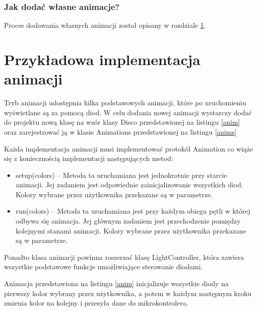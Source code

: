 \documentclass[12pt]{report}
\begin{document}
\subsubsection{Jak dodać własne animacje?}

Proces dodawania własnych animacji został opisany w rozdziale  \ref{animacje}.

\section{Przykładowa implementacja animacji} \label{animacje}

Tryb animacji udostępnia kilka podstawowych animacji, które po uruchomieniu wyświetlane są za pomocą diod. W celu dodania nowej animacji wystarczy dodać do projektu nową klasę na wzór klasy Disco przedstawionej na listingu \ref{anim} oraz zarejestrować ją w klasie Animations przedstawionej na listingu \ref{anims}

 \label{anim}

Każda implementacja animacji musi implementować protokół Animation co wiąże się z koniecznością implementacji następujących metod:

\begin{itemize}
	\item setup(colors) -- Metoda ta uruchamiana jest jednokrotnie przy starcie animacji. Jej zadaniem jest odpowiednie zainicjalizowanie wszystkich diod. Kolory wybrane przez użytkownika przekazane są w parametrze.
	\item run(colors) -- Metoda ta uruchamiana jest przy każdym obiegu pętli w której odbywa się animacja. Jej głównym zadaniem jest przechodzenie pomiędzy kolejnymi stanami animacji. Kolory wybrane przez użytkownika przekazane są w parametrze.
\end{itemize}

Ponadto klasa animacji powinna roszerzać klasę LightController, która zawiera wszystkie podstawowe funkcje umożliwiające sterowanie diodami.

Animacja przedstawiona na listingu \ref{anim} inicjalizuje wszystkie diody na pierwszy kolor wybrany przez użytkownika, a potem w każdym następnym kroku zmienia kolor na kolejny i przesyła dane do mikrokontrolera.

 \label{anims}
\end{document}
